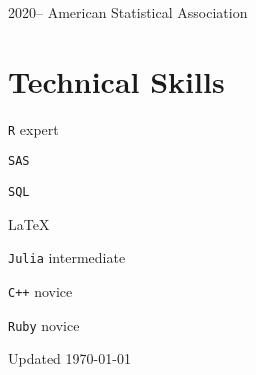 \documentclass[12pt,letterpaper]{report}
\newcommand{\listitemspace}{0.15em}
\renewenvironment{itemize}
{\begin{list}{}{\setlength{\leftmargin}{0em}
            \setlength{\parskip}{0em}
            \setlength{\itemsep}{\listitemspace}
            \setlength{\parsep}{\listitemspace}}}
    {\end{list}}
\begin{document}
    \begin{tablist}

        \item[2020--] \tab American Statistical Association

    \end{tablist}

    \section*{Technical Skills}

    \begin{itemize}

        \item \texttt{R} \tab expert
        
        \item \texttt{SAS}
        
        \item \texttt{SQL}
        
        \item \LaTeX
        
        \item \texttt{Julia} \tab intermediate
        
        \item \texttt{C++} \tab novice
        
        \item \texttt{Ruby} \tab novice

    \end{itemize}

    \begin{center}
        \vfill
        Updated \monthyeardate\today
    \end{center}
\end{document}
